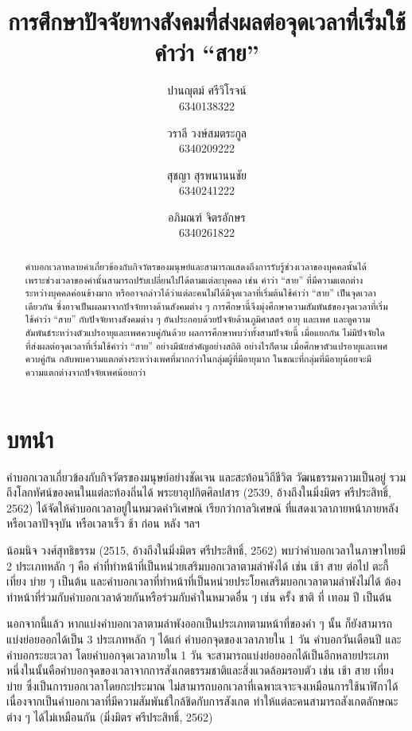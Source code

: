 \documentclass[a4paper]{article}
\title{การศึกษาปัจจัยทางสังคมที่ส่งผลต่อจุดเวลาที่เริ่มใช้คำว่า “สาย”}
\author{
    ปานญุตม์ ศรีวิโรจน์\\6340138322
    \and
    วราลี วงษ์สมตระกูล\\6340209222
    \and
    สุชญา สุรพนานนชัย\\6340241222
    \and
    อภิมณฑ์ จิตรอักษร\\6340261822
}
\date{}
\begin{document}
\maketitle
\begin{abstract}
    คำบอกเวลาหลายคำเกี่ยวข้องกับกิจวัตรของมนุษย์และสามารถแสดงถึงการรับรู้ช่วงเวลาของบุคคลนั้นได้ เพราะช่วงเวลาของคำนั้นสามารถปรับเปลี่ยนไปได้ตามแต่ละบุคคล เช่น คำว่า “สาย” ที่มีความแตกต่างระหว่างบุคคลค่อนข้างมาก หรืออาจกล่าวได้ว่าแต่ละคนไม่ได้มีจุดเวลาที่เริ่มต้นใช้คำว่า “สาย” เป็นจุดเวลาเดียวกัน ซึ่งอาจเป็นผลมาจากปัจจัยทางด้านสังคมต่าง ๆ การศึกษานี้จึงมุ่งศึกษาความสัมพันธ์ของจุดเวลาที่เริ่มใช้คำว่า “สาย” กับปัจจัยทางสังคมต่าง ๆ อันประกอบด้วยปัจจัยด้านภูมิศาสตร์ อายุ และเพศ และดูความสัมพันธ์ระหว่างตัวแปรอายุและเพศควบคู่กันด้วย ผลการศึกษาพบว่าทั้งสามปัจจัยนี้ เมื่อแยกกัน ไม่มีปัจจัยใดที่ส่งผลต่อจุดเวลาที่เริ่มใช้คำว่า “สาย” อย่างมีนัยสำคัญอย่างสถิติ อย่างไรก็ตาม เมื่อศึกษาตัวแปรอายุและเพศควบคู่กัน กลับพบความแตกต่างระหว่างเพศที่มากกว่าในกลุ่มผู้ที่มีอายุมาก ในขณะที่กลุ่มที่มีอายุน้อยจะมีความแตกต่างจากปัจจัยเพศน้อยกว่า
\end{abstract}
\section{บทนำ}
    คำบอกเวลาเกี่ยวข้องกับกิจวัตรของมนุษย์อย่างชัดเจน และสะท้อนวิถีชีวิต วัฒนธรรมความเป็นอยู่ รวมถึงโลกทัศน์ของคนในแต่ละท้องถิ่นได้ พระยาอุปกิตศิลปสาร (2539, อ้างถึงในมิ่งมิตร ศรีประสิทธิ์, 2562) ได้จัดให้คำบอกเวลาอยู่ในหมวดคำวิเศษณ์ เรียกว่ากาลวิเศษณ์ ที่แสดงเวลาภายหน้าภายหลัง หรือเวลาปัจจุบัน หรือเวลาเร็ว ช้า ก่อน หลัง ฯลฯ

    น้อมนิจ วงศ์สุทธิธรรม (2515, อ้างถึงในมิ่งมิตร ศรีประสิทธิ์, 2562) พบว่าคำบอกเวลาในภาษาไทยมี 2 ประเภท\break หลัก ๆ คือ คำที่ทำหน้าที่เป็นหน่วยเสริมบอกเวลาตามลำพังได้ เช่น เช้า สาย ต่อไป ตะกี้ เที่ยง บ่าย ๆ เป็นต้น และคำบอกเวลาที่ทำหน้าที่เป็นหน่วยประโยคเสริมบอกเวลาตามลำพังไม่ได้ ต้องทำหน้าที่ร่วมกับคำบอกเวลาด้วยกันหรือร่วมกับคำในหมวดอื่น ๆ เช่น ครั้ง ชาติ ที่ เทอม ปี เป็นต้น

    นอกจากนี้แล้ว หากแบ่งคำบอกเวลาตามลำพังออกเป็นประเภทตามหน้าที่ของคำ ๆ นั้น ก็ยังสามารถแบ่งย่อยออกได้เป็น 3 ประเภทหลัก ๆ ได้แก่ คำบอกจุดของเวลาภายใน 1 วัน คำบอกวันเดือนปี และคำบอกระยะเวลา โดยคำบอกจุดเวลาภายใน 1 วัน จะสามารถแบ่งย่อยออกได้เป็นอีกหลายประเภท หนึ่งในนั้นคือคำบอกจุดของเวลาจากการสังเกตธรรมชาติและสิ่งแวดล้อมรอบตัว เช่น เช้า สาย เที่ยง บ่าย ซึ่งเป็นการบอกเวลาโดยกะประมาณ ไม่สามารถบอกเวลาที่เฉพาะเจาะจงเหมือนการใช้นาฬิกาได้ เนื่องจากเป็นคำบอกเวลาที่มีความสัมพันธ์ใกล้ชิดกับการสังเกต ทำให้แต่ละคนสามารถสังเกตลักษณะ\break ต่าง ๆ ได้ไม่เหมือนกัน (มิ่งมิตร ศรีประสิทธิ์, 2562)
\end{document}
